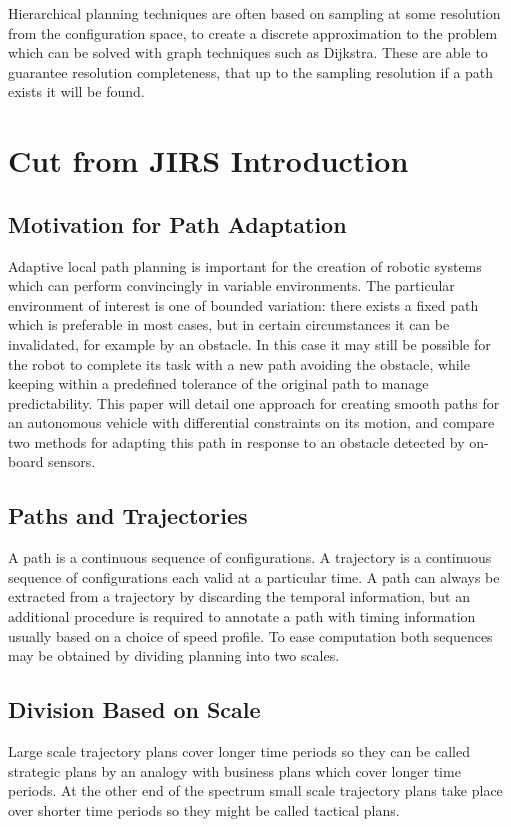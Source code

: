 Hierarchical planning techniques are often based on sampling at some resolution from the configuration space, to create a discrete approximation to the problem which can be solved with graph techniques such as Dijkstra. These are able to guarantee resolution completeness, that up to the sampling resolution if a path exists it will be found.     

\section{Cut from JIRS Introduction}   

\subsection{Motivation for Path Adaptation}
Adaptive local path planning is important for the creation of robotic systems which can perform convincingly in variable environments. The particular environment of interest is one of bounded variation: there exists a fixed path which is preferable in most cases, but in certain circumstances it can be invalidated, for example by an obstacle. In this case it may still be possible for the robot to complete its task with a new path avoiding the obstacle, while keeping within a predefined tolerance of the original path to manage predictability. This paper will detail one approach for creating smooth paths for an autonomous vehicle with differential constraints on its motion, and compare two methods for adapting this path in response to an  obstacle detected by on-board sensors.   

\subsection{Paths and Trajectories}
\label{sec:traj_def}
A path is a continuous sequence of configurations. A trajectory is a continuous sequence of configurations each valid at a particular time. A path can always be extracted from a trajectory by discarding the temporal information, but an additional procedure is required to annotate a path with timing information usually based on a choice of speed profile. To ease computation both sequences may be obtained by dividing planning into two scales. 

\subsection{Division Based on Scale}
\label{sec:scale_division}
Large scale trajectory plans cover longer time periods so they can be called strategic plans by an analogy with business plans which cover longer time periods. At the other end of the spectrum small scale trajectory plans take place over shorter time periods so they might be called tactical plans.

